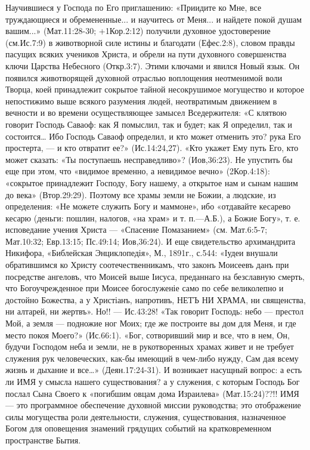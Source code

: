           Научившиеся у Господа по Его приглашению: «Приидите ко Мне, все труждающиеся и обремененные... и научитесь от Меня... и найдете покой душам вашим...» (Мат.11:28-30; +1Кор.2:12) получили духовное удостоверение (см.Ис.7:9) в животворной силе истины и благодати (Ефес.2:8), словом правды пасущих всяких учеников Христа, и обрели на пути духовного совершенства ключи Царства Небесного (Откр.3:7).
          Этими ключами и явился Новый язык. Он появился животворящей духовной отраслью воплощения неотменимой воли Творца, коей принадлежит сокрытое тайной несокрушимое могущество и которое непостижимо выше всякого разумения людей, неотвратимым движением в вечности и во времени осуществляющее замысел Вседержителя: «С клятвою говорит Господь Саваоф: как Я помыслил, так и будет; как Я определил, так и состоится… Ибо Господь Саваоф определил, и кто может отменить это?  рука Его простерта, --- и кто отвратит ее?» (Ис.14:24,27). «Кто укажет Ему путь Его, кто может сказать: «Ты поступаешь несправедливо»? (Иов,36:23).  Не упустить бы еще при этом, что «видимое временно, а невидимое вечно» (2Кор.4:18):  «сокрытое принадлежит Господу, Богу нашему, а открытое нам и сынам нашим до века» (Втор.29:29). Поэтому все храмы земли не Божии, а людские, из определения: «Не можете служить Богу и маммоне», ибо «отдавайте кесарево кесарю (деньги: пошлин, налогов, «на храм» и т. п.—А.Б.), а Божие Богу», т. е. исповедание учения Христа --- «Спасение Помазанием» (см. Мат.6:5-7; Мат.10:32; Евр.13:15; Пс.49:14; Иов,36:24). И еще свидетельство архимандрита Никифора, «Библейская Энциклопедія», М., 1891г., с.544:
                «Іудеи внушали обратившимся ко Христу соотечественникамъ, что законъ Моисеевъ данъ при посредстве ангеловъ, что Моисей выше Іисуса, преданнаго на безславную смерть, что Богоучрежденное при Моисее богослуженіе само по себе великолепно и достойно Божества, а у Христіанъ, напротивъ, НЕТЪ  НИ  ХРАМА, ни священства, ни алтарей, ни жертвъ». Но!! --- Ис.43:28!
    «Так говорит Господь: небо --- престол Мой, а земля --- подножие ног Моих; где же построите вы дом для Меня, и где место покоя Моего?» (Ис.66:1).  «Бог, сотворивший мир и все, что в нем, Он, будучи Господом неба и земли, не в рукотворенных храмах живет и не требует служения рук человеческих, как-бы имеющий в чем-либо нужду, Сам дая всему жизнь и дыхание и все…» (Деян.17:24-31).
    И возникает насущный вопрос: а есть ли ИМЯ у смысла нашего существования? а у служения, с которым Господь Бог послал Сына Своего к «погибшим овцам дома Израилева» (Мат.15:24)??!!
        ИМЯ --- это программное обеспечение духовной миссии руководства;   это отображение силы могущества роли деятельности, служения, существования, назначенное Богом для оповещения знамений грядущих событий на кратковременном пространстве Бытия.


